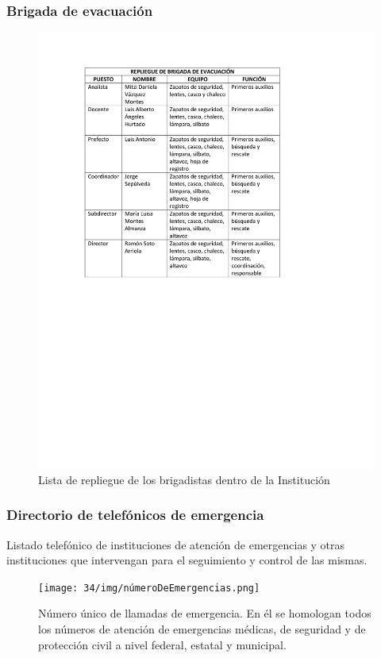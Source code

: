     \subsubsection{Brigada de evacuación}
    \begin{figure}[H]
        \centering
        \includegraphics[trim = {1mm 120mm 1mm 1mm},clip,scale=0.45]{34/img/repliegueBrigada.pdf}
        \caption{Lista de repliegue de los brigadistas dentro de la Institución}
        \label{fig:repliegueBrigada}
    \end{figure}
    \subsubsection{Directorio de telefónicos de emergencia}
    
    Listado telefónico de instituciones de atención de emergencias y otras instituciones que intervengan para el seguimiento y control de las mismas.
    
    \begin{figure}[H]
        \centering
        \texttt{[image: 34/img/númeroDeEmergencias.png]}
        \caption{Número único de llamadas de emergencia. En él se homologan todos los números de atención de emergencias médicas, de seguridad y de protección civil a nivel federal, estatal y municipal.}
        \label{fig:númeroDeEmergencias}
    \end{figure}
    
